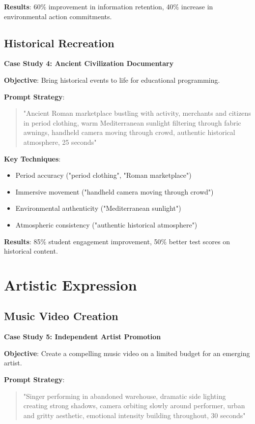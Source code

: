 \textbf{Results}: 60\% improvement in information retention, 40\% increase in environmental action commitments.

\subsection{Historical Recreation}
\textbf{Case Study 4: Ancient Civilization Documentary}

\textbf{Objective}: Bring historical events to life for educational programming.

\textbf{Prompt Strategy}:
\begin{quote}
"Ancient Roman marketplace bustling with activity, merchants and citizens in period clothing, warm Mediterranean sunlight filtering through fabric awnings, handheld camera moving through crowd, authentic historical atmosphere, 25 seconds"
\end{quote}

\textbf{Key Techniques}:
\begin{itemize}
\item Period accuracy ("period clothing", "Roman marketplace")
\item Immersive movement ("handheld camera moving through crowd")
\item Environmental authenticity ("Mediterranean sunlight")
\item Atmospheric consistency ("authentic historical atmosphere")
\end{itemize}

\textbf{Results}: 85\% student engagement improvement, 50\% better test scores on historical content.

\section{Artistic Expression}

\subsection{Music Video Creation}
\textbf{Case Study 5: Independent Artist Promotion}

\textbf{Objective}: Create a compelling music video on a limited budget for an emerging artist.

\textbf{Prompt Strategy}:
\begin{quote}
"Singer performing in abandoned warehouse, dramatic side lighting creating strong shadows, camera orbiting slowly around performer, urban and gritty aesthetic, emotional intensity building throughout, 30 seconds"
\end{quote}

